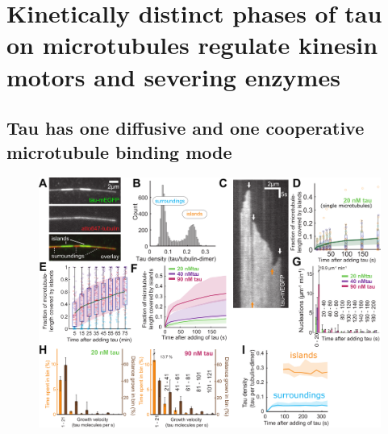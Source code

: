\section{Kinetically distinct phases of tau on microtubules regulate kinesin motors and severing enzymes}
\label{sec:tau}
\subsection{Tau has one diffusive and one cooperative microtubule binding mode}
\begin{figure}[b!]
\centering
\includegraphics[width=1\linewidth]{Figures/tauGROW.png}
\end{figure}
